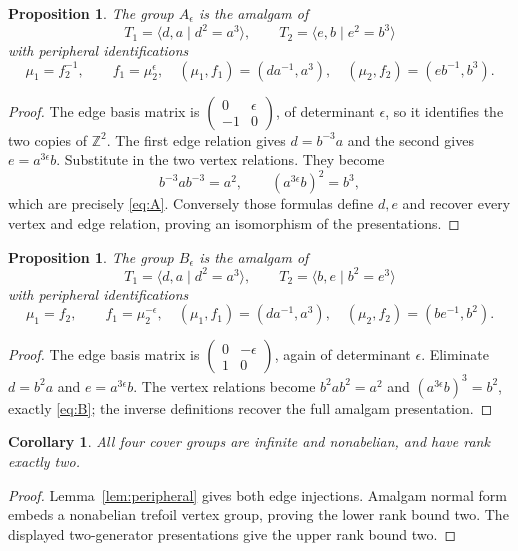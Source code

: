\documentclass[11pt]{article}
\newtheorem{proposition}[theorem]{Proposition}
\newtheorem{corollary}[theorem]{Corollary}
\newcommand{\Z}{\mathbb Z}
\begin{document}
\begin{proposition}\label{prop:A}
The group $A_\epsilon$ is the amalgam of
\[
 T_1=\langle d,a\mid d^2=a^3\rangle,\qquad
 T_2=\langle e,b\mid e^2=b^3\rangle
\]
with peripheral identifications
\[
 \mu_1=f_2^{-1},\qquad f_1=\mu_2^\epsilon,
 \quad
 (\mu_1,f_1)=(da^{-1},a^3),\quad
 (\mu_2,f_2)=(eb^{-1},b^3).
\]
\end{proposition}
\begin{proof}
The edge basis matrix is
$\left(\begin{smallmatrix}0&\epsilon\\-1&0\end{smallmatrix}\right)$,
of determinant $\epsilon$, so it identifies the two copies of
$\Z^2$. The first edge relation gives $d=b^{-3}a$ and the
second gives $e=a^{3\epsilon}b$. Substitute in the two vertex
relations. They become
\[
 b^{-3}ab^{-3}=a^2,\qquad
 (a^{3\epsilon}b)^2=b^3,
\]
which are precisely \eqref{eq:A}. Conversely those formulas
define $d,e$ and recover every vertex and edge relation, proving
an isomorphism of the presentations.
\end{proof}

\begin{proposition}\label{prop:B}
The group $B_\epsilon$ is the amalgam of
\[
 T_1=\langle d,a\mid d^2=a^3\rangle,\qquad
 T_2=\langle b,e\mid b^2=e^3\rangle
\]
with peripheral identifications
\[
 \mu_1=f_2,\qquad f_1=\mu_2^{-\epsilon},
 \quad
 (\mu_1,f_1)=(da^{-1},a^3),\quad
 (\mu_2,f_2)=(be^{-1},b^2).
\]
\end{proposition}
\begin{proof}
The edge basis matrix is
$\left(\begin{smallmatrix}0&-\epsilon\\1&0\end{smallmatrix}\right)$,
again of determinant $\epsilon$. Eliminate
$d=b^2a$ and $e=a^{3\epsilon}b$. The vertex relations become
$b^2ab^2=a^2$ and $(a^{3\epsilon}b)^3=b^2$, exactly
\eqref{eq:B}; the inverse definitions recover the full
amalgam presentation.
\end{proof}

\begin{corollary}\label{cor:groups}
All four cover groups are infinite and nonabelian, and have
rank exactly two.
\end{corollary}
\begin{proof}
Lemma~\ref{lem:peripheral} gives both edge injections. Amalgam
normal form embeds a nonabelian trefoil vertex group, proving
the lower rank bound two. The displayed two-generator
presentations give the upper rank bound two.
\end{proof}
\end{document}
